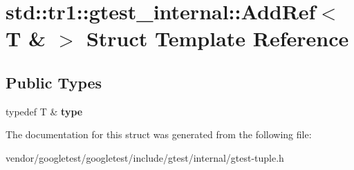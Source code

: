 \hypertarget{structstd_1_1tr1_1_1gtest__internal_1_1AddRef_3_01T_01_6_01_4}{}\section{std\+:\+:tr1\+:\+:gtest\+\_\+internal\+:\+:Add\+Ref$<$ T \& $>$ Struct Template Reference}
\label{structstd_1_1tr1_1_1gtest__internal_1_1AddRef_3_01T_01_6_01_4}
\subsection*{Public Types}
\begin{DoxyCompactItemize}
\item 
typedef T \& {\bfseries type}\hypertarget{structstd_1_1tr1_1_1gtest__internal_1_1AddRef_3_01T_01_6_01_4_a9cb3b0992c2a9e7df42d01fb64c2dc88}{}\label{structstd_1_1tr1_1_1gtest__internal_1_1AddRef_3_01T_01_6_01_4_a9cb3b0992c2a9e7df42d01fb64c2dc88}

\end{DoxyCompactItemize}


The documentation for this struct was generated from the following file\+:\begin{DoxyCompactItemize}
\item 
vendor/googletest/googletest/include/gtest/internal/gtest-\/tuple.\+h\end{DoxyCompactItemize}
